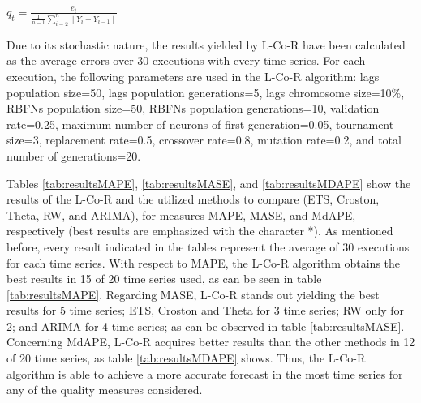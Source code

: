 \documentclass[a4paper,twoside]{article}
\newcommand{\metodo}{L-Co-R}
\begin{document}
 \begin{center}
 \smallskip
 $q_t = \displaystyle\frac{e_t}{\displaystyle\frac{1}{n-1} \sum_{i=2}^n \mid Y_i - Y_{i-1} \mid }$
 \end{center}




Due to its stochastic nature, the results yielded by {\metodo} have been calculated as the average errors over 30 executions with every time series. For each execution, the following parameters are
used in the {\metodo} algorithm: lags population size=50, lags
population generations=5, lags chromosome size=10\%, RBFNs population
size=50, RBFNs population generations=10, validation rate=0.25,
maximum number of neurons of first generation=0.05, tournament size=3,
replacement rate=0.5, crossover rate=0.8, mutation rate=0.2, and total
number of generations=20. 


Tables \ref{tab:resultsMAPE}, \ref{tab:resultsMASE}, and \ref{tab:resultsMDAPE} show the results of the {\metodo} and the utilized methods to compare (ETS, Croston, Theta, RW, and ARIMA), for measures MAPE, MASE, and MdAPE, respectively (best results are emphasized with the character *). As mentioned before, every result indicated in the tables represent the average of 30 executions for each time series. With respect to MAPE, the {\metodo} algorithm obtains the best results in 15 of 20 time series used, as can be seen in table \ref{tab:resultsMAPE}. Regarding MASE, {\metodo} stands out yielding the best results for 5 time series; ETS, Croston and Theta for 3 time series; RW only for 2; and ARIMA for 4 time series; as can be observed in table \ref{tab:resultsMASE}. Concerning MdAPE, {\metodo} acquires better results than the other methods in 12 of 20 time series, as table \ref{tab:resultsMDAPE} shows. Thus, the {\metodo} algorithm is able to achieve a more accurate forecast in the most time series for any of the quality measures considered.
\end{document}
